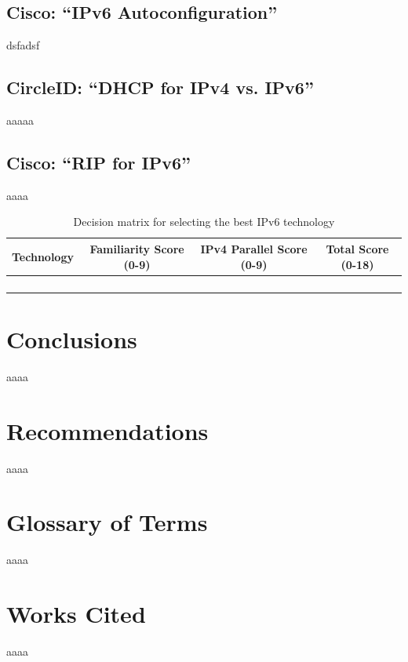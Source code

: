 \documentclass[12pt]{article}
\begin{document}
\subsection{Cisco: ``IPv6 Autoconfiguration''}
dsfadsf
\subsection{CircleID: ``DHCP for IPv4 vs. IPv6''}
aaaaa
\subsection{Cisco: ``RIP for IPv6''}
aaaa

\medskip
\begin{table}[h!]
  \centering
  \label{table:dec_matrix}
  \begin{tabulary}{\textwidth}{|L|C|C|C|}
    \hline
    Technology & Familiarity Score (0-9) & IPv4 Parallel Score (0-9) & Total Score (0-18) \\ \hline\hline
    & & & \\ \hline
    & & & \\ \hline
    & & & \\ \hline
    & & & \\ \hline
    \hline
  \end{tabulary}
  \caption{Decision matrix for selecting the best IPv6 technology}
\end{table}


\section{Conclusions}
aaaa

\section{Recommendations}
aaaa

\section{Glossary of Terms}
aaaa

\section{Works Cited}
aaaa
\end{document}
